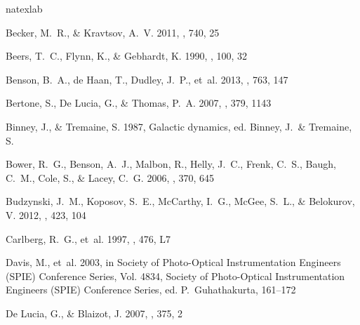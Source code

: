\documentclass[iop]{emulateapj}
\begin{document}

\begin{thebibliography}{42}
\expandafter\ifx\csname natexlab\endcsname\relax\def\natexlab#1{#1}\fi

{Becker}, M.~R., \& {Kravtsov}, A.~V. 2011, \apj, 740, 25

{Beers}, T.~C., {Flynn}, K., \& {Gebhardt}, K. 1990, \aj, 100, 32

{Benson}, B.~A., {de Haan}, T., {Dudley}, J.~P., {et~al.} 2013, \apj, 763, 147

{Bertone}, S., {De Lucia}, G., \& {Thomas}, P.~A. 2007, \mnras, 379, 1143

{Binney}, J., \& {Tremaine}, S. 1987, {Galactic dynamics}, ed. {Binney, J.~\&
  Tremaine, S.}

{Bower}, R.~G., {Benson}, A.~J., {Malbon}, R., {Helly}, J.~C., {Frenk}, C.~S.,
  {Baugh}, C.~M., {Cole}, S., \& {Lacey}, C.~G. 2006, \mnras, 370, 645

{Budzynski}, J.~M., {Koposov}, S.~E., {McCarthy}, I.~G., {McGee}, S.~L., \&
  {Belokurov}, V. 2012, \mnras, 423, 104
  
{Carlberg}, R.~G., {et~al.} 1997, \apjl, 476, L7

{Davis}, M., {et~al.} 2003, in Society of Photo-Optical Instrumentation
  Engineers (SPIE) Conference Series, Vol. 4834, Society of Photo-Optical
  Instrumentation Engineers (SPIE) Conference Series, ed. P.~{Guhathakurta},
  161--172

{De Lucia}, G., \& {Blaizot}, J. 2007, \mnras, 375, 2


\end{thebibliography}
\end{document}
